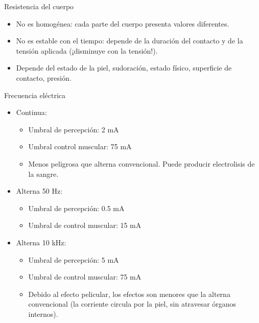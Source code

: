 \documentclass[aspectratio=169, usenames,svgnames,dvipsnames]{beamer}
\begin{document}
\begin{frame}[label={sec:orgb0a5d42}]{Resistencia del cuerpo}
\begin{itemize}
\item \alert{No es homogénea}: cada parte del cuerpo presenta valores diferentes.

\item \alert{No es estable con el tiempo}: depende de la duración del contacto
y de la tensión aplicada (¡disminuye con la tensión!).

\item Depende del estado de la piel, sudoración, estado físico, superficie
de contacto, presión.
\end{itemize}
\end{frame}

\begin{frame}[label={sec:orgb45c32c}]{Frecuencia eléctrica}
\begin{itemize}
\item Continua:

\begin{itemize}
\item Umbral de percepción: 2 mA

\item Umbral control muscular: 75 mA

\item Menos peligrosa que alterna convencional. Puede producir
electrolisis de la sangre.
\end{itemize}

\item Alterna 50 Hz:

\begin{itemize}
\item Umbral de percepción: 0.5 mA

\item Umbral de control muscular: 15 mA
\end{itemize}

\item Alterna 10 kHz:

\begin{itemize}
\item Umbral de percepción: 5 mA

\item Umbral de control muscular: 75 mA

\item Debido al efecto pelicular, los efectos son menores que la alterna
convencional (la corriente circula por la piel, sin atravesar
órganos internos).
\end{itemize}
\end{itemize}
\end{frame}
\end{document}
